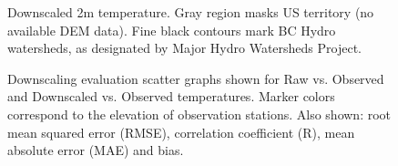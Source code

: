 \documentclass{article}
\begin{document}
\begin{landscape}
\begin{figure}
\caption{Downscaled 2m temperature. Gray region masks US territory (no available DEM data). Fine black contours mark BC Hydro watersheds, as designated by Major Hydro Watersheds Project.}\label{fig:downscaledT}
\end{figure}

\begin{figure}
\caption{Downscaling evaluation scatter graphs shown for Raw vs. Observed and Downscaled vs. Observed temperatures. Marker colors correspond to the elevation of observation stations. Also shown: root mean squared error (RMSE), correlation coefficient (R), mean absolute error (MAE) and bias.}\label{fig:verifDS}
\end{figure}


\end{landscape}
\end{document}
